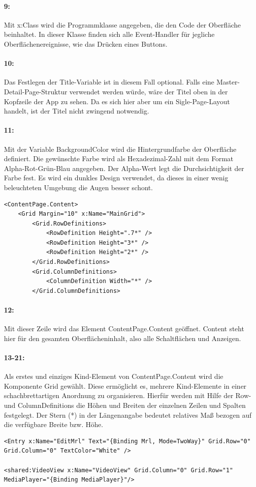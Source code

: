 \paragraph{9:} Mit x:Class wird die Programmklasse angegeben, die den Code der Oberfläche beinhaltet. In dieser Klasse finden sich alle Event-Handler für jegliche Oberflächenereignisse, wie das Drücken eines Buttons.
\paragraph{10:} Das Festlegen der Title-Variable ist in diesem Fall optional. Falls eine Master-Detail-Page-Struktur verwendet werden würde, wäre der Titel oben in der Kopfzeile der App zu sehen. Da es sich hier aber um ein Sigle-Page-Layout handelt, ist der Titel nicht zwingend notwendig.
\paragraph{11:} Mit der Variable BackgroundColor wird die Hintergrundfarbe der Oberfläche definiert. Die gewünschte Farbe wird als Hexadezimal-Zahl mit dem Format Alpha-Rot-Grün-Blau angegeben. Der Alpha-Wert legt die Durchsichtigkeit der Farbe fest. Es wird ein dunkles Design verwendet, da dieses in einer wenig beleuchteten Umgebung die Augen besser schont.

\begin{verbatim}
<ContentPage.Content>
    <Grid Margin="10" x:Name="MainGrid">
        <Grid.RowDefinitions>
            <RowDefinition Height=".7*" />
            <RowDefinition Height="3*" />
            <RowDefinition Height="2*" />
        </Grid.RowDefinitions>
        <Grid.ColumnDefinitions>
            <ColumnDefinition Width="*" />
        </Grid.ColumnDefinitions>
\end{verbatim}
\paragraph{12:} Mit dieser Zeile wird das Element ContentPage.Content geöffnet. Content steht hier für den gesamten Oberflächeninhalt, also alle Schaltflächen und Anzeigen.
\paragraph{13-21:} Als erstes und einziges Kind-Element von ContentPage.Content wird die Komponente Grid gewählt. Diese ermöglicht es, mehrere Kind-Elemente in einer schachbrettartigen Anordnung zu organisieren. Hierfür werden mit Hilfe der Row- und ColumnDefinitions die Höhen und Breiten der einzelnen Zeilen und Spalten festgelegt. Der Stern (*) in der Längenangabe bedeutet relatives Maß bezogen auf die verfügbare Breite bzw. Höhe.
\begin{verbatim}
<Entry x:Name="EditMrl" Text="{Binding Mrl, Mode=TwoWay}" Grid.Row="0" Grid.Column="0" TextColor="White" />

<shared:VideoView x:Name="VideoView" Grid.Column="0" Grid.Row="1" MediaPlayer="{Binding MediaPlayer}"/>
\end{verbatim}
